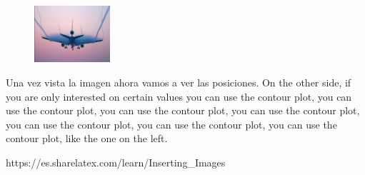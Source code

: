 \documentclass{report}
\begin{document}
\begin{figure} %
    \centering
    \includegraphics[width=0.25\textwidth]{img/arre}
\end{figure}

Una vez vista la imagen ahora vamos a ver las posiciones. On the other side, if you are only interested on certain values you can use the contour plot, you can use the contour plot, you can use the contour plot, you can use the contour plot, you can use the contour plot, you can use the contour plot, you can use the contour plot, like the one on the left.\\

\begin{thebibliography}{99}

 https://es.sharelatex.com/learn/Inserting\_Images

\end{thebibliography}
\end{document}
